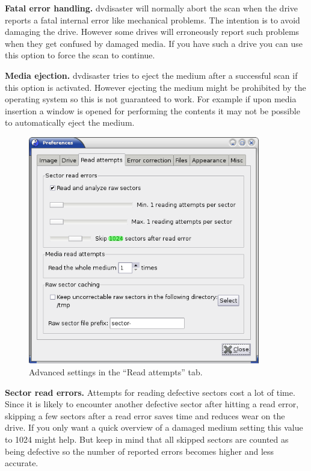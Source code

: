 {\bf Fatal error handling.} dvdisaster will normally abort the scan
when the drive reports a fatal internal error like mechanical problems.
The intention is to avoid damaging the drive. However some drives
will erroneously report such problems when they get confused by
damaged media. If you have such a drive you can use this option
to force the scan to continue.

\bigskip

{\bf Media ejection.} dvdisaster tries to eject the medium after
a successful scan if this option is activated. However ejecting
the medium might be prohibited by the operating system so this
is not guaranteed to work. For example if upon media insertion
a window is opened for performing the contents it may not be
possible to automatically eject the medium.

\newpage
\begin{figure}[h]
\centerline{\includegraphics[width=0.9\textwidth]{screenshots/scan-prefs-read-attempts-adv.png}}
\caption{Advanced settings in the ``Read attempts'' tab.}  
\label{howto-scan-prefs-read-attempts-adv}
\end{figure}

{\bf Sector read errors.} \label{howto-scan-advanced-settings-read-attempts} Attempts
for reading defective sectors
cost a lot of time. Since it is likely to encounter another defective
sector after hitting a read error, skipping a few sectors after a
read error saves time and reduces wear on the drive. If you only want
a quick overview of a damaged medium setting this value to 1024 might help.
But keep in mind that all skipped sectors are counted as being defective
so the number of reported errors becomes higher and less accurate.

